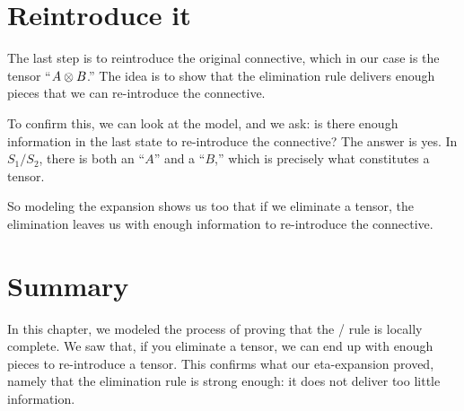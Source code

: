 \documentclass[../../../main.tex]{subfiles}
\begin{document}
\section{Reintroduce it}

The last step is to reintroduce the original connective, which in our case is the tensor ``$A \tensor/ B$.'' The idea is to show that the elimination rule delivers enough pieces that we can re-introduce the connective. 

To confirm this, we can look at the model, and we ask: is there enough information in the last state to re-introduce the connective? The answer is yes. In $S_{1}/S_{2}$, there is both an ``$A$'' and a ``$B$,'' which is precisely what constitutes a tensor.

So modeling the expansion shows us too that if we eliminate a tensor, the elimination leaves us with enough information to re-introduce the connective.


\section{Summary}

In this chapter, we modeled the process of proving that the \tensorElim/ rule is locally complete. We saw that, if you eliminate a tensor, we can end up with enough pieces to re-introduce a tensor. This confirms what our eta-expansion proved, namely that the elimination rule is strong enough: it does not deliver too little information.
\end{document}
